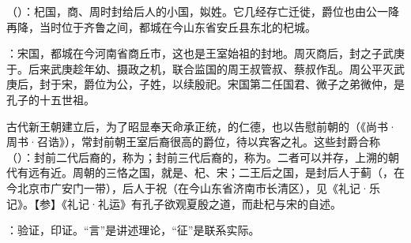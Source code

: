 {
\item {}（）：杞国，商、周时封给后人的小国，姒姓。它几经存亡迁徙，爵位也由公一降再降，当时位于齐鲁之间，都城在今山东省安丘县东北的杞城。

：宋国，都城在今河南省商丘市，这也是王室始祖的封地。周灭商后，封之子武庚于。后来武庚趁年幼、摄政之机，联合监国的周王叔管叔、蔡叔作乱。周公平灭武庚后，封于宋，爵位为公，子姓，以续殷祀。宋国第二任国君、微子之弟微仲，是孔子的十五世祖。

古代新王朝建立后，为了昭显奉天命承正统，的仁德，也以告慰前朝的（《尚书·周书·召诰》），常封前朝王室后裔很高的爵位，待以宾客之礼。这些封爵合称（）：封前二代后裔的，称为；封前三代后裔的，称为。二者可以并存，上溯的朝代有远有近。周朝的三恪之国，就是、杞、宋；二王后之国，是封后人于蓟（，在今北京市广安门一带），后人于祝（在今山东省济南市长清区），见《礼记·乐记》。【参】《礼记·礼运》有孔子欲观夏殷之道，而赴杞与宋的自述。%

\item {}：验证，印证。“言”是讲述理论，“征”是联系实际。
}
{}  %


